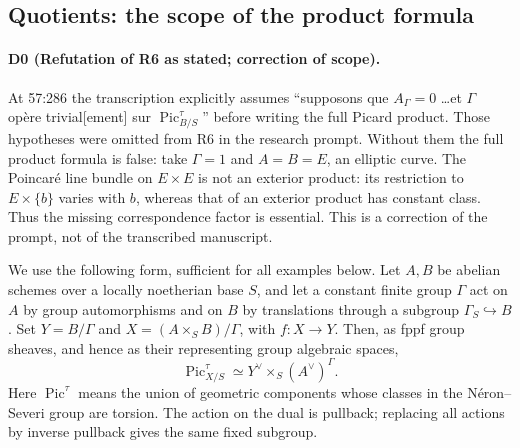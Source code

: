 \subsection{Quotients: the scope of the product formula}
\paragraph{D0 (Refutation of R6 as stated; correction of scope).}
At 57:286 the transcription explicitly assumes
``supposons que $A_{\Gamma}=0$ \dots et $\Gamma$ opère trivial[ement]
sur $\operatorname{Pic}^{\tau}_{B/S}$'' before writing the full Picard product.
Those hypotheses were omitted from R6 in the research prompt.  Without them
the full product formula is false: take $\Gamma=1$ and $A=B=E$, an elliptic
curve.  The Poincaré line bundle on $E\times E$ is not an exterior product:
its restriction to $E\times\{b\}$ varies with $b$, whereas that of an
exterior product has constant class.  Thus the missing correspondence
factor is essential.  This is a correction of the prompt, not of the
transcribed manuscript.

We use the following form, sufficient for all examples below.  Let $A,B$
be abelian schemes over a locally noetherian base $S$, and let a constant
finite group $\Gamma$ act on $A$ by group automorphisms and on $B$ by
translations through a subgroup $\Gamma_S\hookrightarrow B$.  Set
$Y=B/\Gamma$ and $X=(A\times_S B)/\Gamma$, with $f:X\to Y$.  Then, as fppf
group sheaves, and hence as their representing group algebraic spaces,
\begin{equation}\label{dgj:pic-tau}
 \operatorname{Pic}^{\tau}_{X/S}
 \simeq Y^\vee\times_S(A^\vee)^\Gamma.
\end{equation}
Here $\operatorname{Pic}^{\tau}$ means the union of geometric components
whose classes in the Néron--Severi group are torsion.  The action on the
dual is pullback; replacing all actions by inverse pullback gives the
same fixed subgroup.

